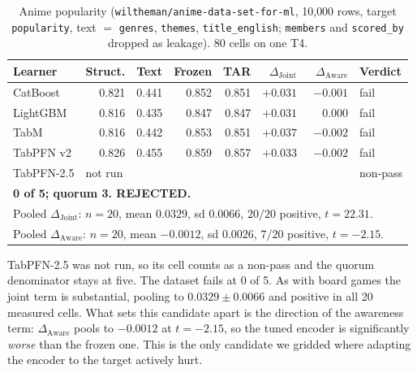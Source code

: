 \documentclass{article}
\newcommand{\djoint}{\Delta_{\text{Joint}}}
\newcommand{\daware}{\Delta_{\text{Aware}}}
\begin{document}
\begin{table}[H]
\centering\small
\caption{Anime popularity (\texttt{wiltheman/anime-data-set-for-ml}, 10{,}000 rows, target
\texttt{popularity}, text $=$ \texttt{genres}, \texttt{themes}, \texttt{title\_english};
\texttt{members} and \texttt{scored\_by} dropped as leakage). 80 cells on one T4.}
\begin{tabular}{lrrrrrrl}
\toprule
Learner & Struct. & Text & Frozen & TAR & $\djoint$ & $\daware$ & Verdict \\
\midrule
CatBoost   & 0.821 & 0.441 & 0.852 & 0.851 & $+0.031$ & $-0.001$ & fail \\
LightGBM   & 0.816 & 0.435 & 0.847 & 0.847 & $+0.031$ & $\phantom{-}0.000$ & fail \\
TabM       & 0.816 & 0.442 & 0.853 & 0.851 & $+0.037$ & $-0.002$ & fail \\
TabPFN v2  & 0.826 & 0.455 & 0.859 & 0.857 & $+0.033$ & $-0.002$ & fail \\
TabPFN-2.5 & \multicolumn{6}{l}{not run} & non-pass \\
\midrule
\multicolumn{8}{l}{\textbf{0 of 5; quorum 3. REJECTED.}} \\
\multicolumn{8}{l}{Pooled $\djoint$: $n{=}20$, mean $0.0329$, sd $0.0066$, $20/20$ positive, $t = 22.31$.} \\
\multicolumn{8}{l}{Pooled $\daware$: $n{=}20$, mean $-0.0012$, sd $0.0026$, $7/20$ positive, $t = -2.15$.} \\
\bottomrule
\end{tabular}
\end{table}

\noindent TabPFN-2.5 was not run, so its cell counts as a non-pass and the quorum denominator stays at
five. The dataset fails at 0 of 5. As with board games the joint term is substantial, pooling
to $0.0329 \pm 0.0066$ and positive in all 20 measured cells. What sets this candidate apart is
the direction of the awareness term: $\daware$ pools to $-0.0012$ at $t = -2.15$, so the tuned
encoder is significantly \emph{worse} than the frozen one. This is the only candidate we
gridded where adapting the encoder to the target actively hurt.
\end{document}
